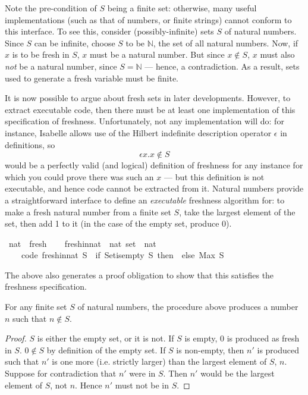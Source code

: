 Note the pre-condition of \(S\) being a finite set: otherwise, many useful implementations (such as that of numbers, or finite strings) cannot conform to this interface.
To see this, consider (possibly-infinite) sets \(S\) of natural numbers.
Since \(S\) can be infinite, choose \(S\) to be \(\mathbb{N}\), the set of all natural numbers.
Now, if \(x\) is to be fresh in \(S\), \(x\) must be a natural number.
But since \(x \notin S\), \(x\) must also \emph{not} be a natural number, since \(S = \mathbb{N}\) --- hence, a contradiction.
As a result, sets used to generate a fresh variable must be finite.

It is now possible to argue about fresh sets in later developments.
However, to extract executable code, then there must be at least one implementation of this specification of freshness.
Unfortunately, not any implementation will do: for instance, Isabelle allows use of the Hilbert indefinite description operator \(\epsilon\) in definitions, so
\[
\epsilon x. x \notin S
\]
would be a perfectly valid (and logical) definition of freshness for any instance for which you could prove there was such an \(x\) --- but this definition is not executable, and hence code cannot be extracted from it.
Natural numbers provide a straightforward interface to define an \emph{executable} freshness algorithm for: to make a fresh natural number from a finite set \(S\), take the largest element of the set, then add 1 to it (in the case of the empty set, produce 0).

\begin{implementation}
\isamarkupfalse%
\ nat\ {\isacharcolon}{\isacharcolon}\ fresh\isanewline
{}\isanewline
\ \ \isamarkupfalse%
\ fresh{\isacharunderscore}in{\isacharunderscore}nat\ {\isacharcolon}{\isacharcolon}\ {\isachardoublequoteopen}nat\ set\ {\isasymRightarrow}\ nat{\isachardoublequoteclose}\ \isanewline
\ \ \ \ {\isacharbrackleft}code{\isacharbrackright}{\isacharcolon}\ {\isachardoublequoteopen}fresh{\isacharunderscore}in{\isacharunderscore}nat\ S\ {\isasymequiv}\ {\isacharparenleft}if\ Set{\isachardot}is{\isacharunderscore}empty\ S\ then\ {}\ else\ Max\ S\ {\isacharplus}\ {}{\isacharparenright}{\isachardoublequoteclose}\isanewline
\end{implementation}

The above also generates a proof obligation to show that this satisfies the freshness specification.

\begin{lemma}
For any finite set \(S\) of natural numbers, the procedure above produces a number \(n\) such that \(n \notin S\).
\end{lemma}
\begin{proof}
\(S\) is either the empty set, or it is not.
If \(S\) is empty, 0 is produced as fresh in \(S\).
\(0 \notin S\) by definition of the empty set.
If \(S\) is non-empty, then \(n'\) is produced such that \(n'\) is one more (i.e. strictly larger) than the largest element of \(S\), \(n\).
Suppose for contradiction that \(n'\) were in \(S\).
Then \(n'\) would be the largest element of \(S\), not \(n\).
Hence \(n'\) must not be in \(S\).
\end{proof}

